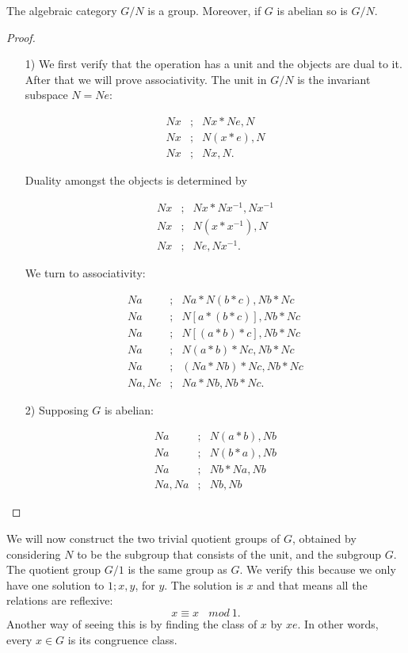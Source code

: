 \documentclass [12pt]{book}
\begin{document}
\begin{theorem}The algebraic category $G/N$ is a group. Moreover, if $G$ is abelian so is $G/N$.\end{theorem}

\begin{proof}\makebox[5pt][]{}\mbox {}
\nonumber\begin{itemize}\item[1)]We first verify that the operation has a unit and the objects are dual to it.  After that we will prove associativity. The unit in $G/N$ is the invariant subspace $N=Ne$:

\begin{eqnarray}\nonumber Nx&;&Nx*Ne,N\\\nonumber Nx&;&N(x*e),N\\\nonumber Nx&;&Nx,N.\end{eqnarray}

Duality amongst the objects is determined by

\begin{eqnarray}\nonumber Nx&;&Nx*Nx^{-1},Nx^{-1}\\\nonumber Nx&;&N(x*x^{-1}),N\\\nonumber Nx&;&Ne,Nx^{-1}.\end{eqnarray}

We turn to associativity: 

\begin{eqnarray}\nonumber Na&;&Na*N(b*c),Nb*Nc\\\nonumber Na&;&N[a*(b*c)],Nb*Nc\\\nonumber Na&;&N[(a*b)*c],Nb*Nc\\\nonumber Na&;&N(a*b)*Nc,Nb*Nc\\\nonumber Na&;&(Na*Nb)*Nc,Nb*Nc\\\nonumber Na,Nc&;&Na*Nb,Nb*Nc.\end{eqnarray}

\item[2)] Supposing $G$ is abelian:

\begin{eqnarray}\nonumber Na&;&N(a*b),Nb\\\nonumber Na&;&N(b*a),Nb\\\nonumber Na&;&Nb*Na,Nb\\\nonumber Na,Na&;&Nb,Nb\end{eqnarray}

\end{itemize}\end{proof}

We will now construct the two trivial quotient groups of $G$, obtained by considering $N$ to be the subgroup that consists of the unit, and the subgroup $G$. The quotient group $G/1$ is the same group as $G$. We verify this because we only have one solution to $1;x,y$, for $y$. The solution is $x$ and that means all the relations are reflexive:$$x\equiv x~~~~mod ~1.$$Another way of seeing this is by finding the class of $x$ by $xe$. In other words, every $x\in G$ is its congruence class. 
\end{document}
